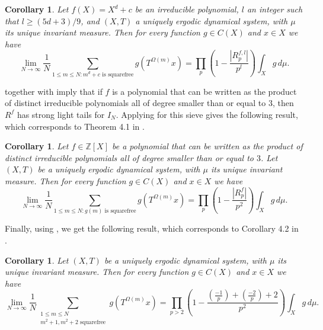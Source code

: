\documentclass[a4paper,11pt,reqno]{amsart}
\theoremstyle{plain}
\newtheorem{corollary}[theorem]{Corollary}
\theoremstyle{remark}
\newcommand{\z}{\mathbb{Z}}
\begin{document}
				\begin{corollary}
					Let $f(X) = X^d+c$ be an irreducible polynomial, $l $ an integer such that $l \geq (5d+3)/9$, and $(X,T)$ a uniquely ergodic dynamical system, with $\mu$ its unique invariant measure. Then for every function $g \in C(X)$ and $x \in X$ we have
					$$\lim_{N\rightarrow\infty} \frac{1}{N}\sum_{1\leq m\leq N: m^d+c \text{ is squarefree}} g(T^{\Omega(m)}x) = \prod_p\left(1-\frac{|R^{f,l}_p|}{p^l}\right)\int_X g \,d \mu.$$
				\end{corollary}
				
				 together with  imply that if $f$ is a polynomial that can be written as the product of distinct irreducible polynomials all of degree smaller than or equal to $3$, then $R^f$ has strong light tails for $I_N$. Applying  for this sieve gives the following result, which corresponds to Theorem 4.1 in \cite{Wang}.
				
				\begin{corollary}
					Let $f \in \z[X]$ be a polynomial that can be written as the product of distinct irreducible polynomials all of degree smaller than or equal to $3$. Let $(X,T)$ be a uniquely ergodic dynamical system, with $\mu$ its unique invariant measure. Then for every function $g \in C(X)$ and $x \in X$ we have
					$$\lim_{N\rightarrow\infty} \frac{1}{N}\sum_{1\leq m\leq N: g(m) \text{ is squarefree}} g(T^{\Omega(m)}x) = \prod_p\left(1-\frac{|R^{f}_p|}{p^2}\right)\int_X g \,d \mu.$$
				\end{corollary}
				
				Finally, using , we get the following result, which corresponds to Corollary 4.2 in \cite{Wang}.
				
				\begin{corollary}
					Let $(X,T)$ be a uniquely ergodic dynamical system, with $\mu$ its unique invariant measure. Then for every function $g \in C(X)$ and $x \in X$ we have
					$$\lim_{N\rightarrow\infty} \frac{1}{N}\sum_{\substack{1\leq m\leq N \\ m^2+1,m^2+2 \text{ squarefree}}} g(T^{\Omega(m)}x) = \prod_{p>2} \left(1-\frac{\left(\frac{-1}{p}\right)+ \left(\frac{-2}{p}\right)+2 }{p^2}\right)\int_X g \,d \mu.$$
				\end{corollary}
				
				
				
			
				
\end{document}
